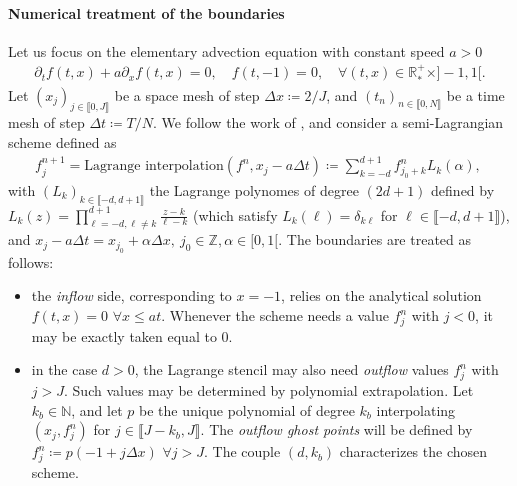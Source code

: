\documentclass{article}
\numberwithin{equation}{section}
\newcommand{\N}{\mathbb{N}}
\newcommand{\R}{\mathbb{R}}
\newcommand{\todo}[1]{{\color{red}\textbf{#1}}}
\begin{document}


\paragraph{Numerical treatment of the boundaries}

Let us focus on the elementary advection equation with constant speed $a>0$
\begin{align*}
	\partial_t f (t,x) + a \partial_x f(t,x) = 0, \quad f(t,-1) = 0, \quad \forall (t,x) \in \R^+_* \times ]-1,1[.
\end{align*}
Let $(x_j)_{j\in\llbracket0,J\rrbracket}$ be a space mesh of step $\Delta x \coloneqq 2/J$, and $(t_n)_{n\in\llbracket 0,N \rrbracket}$ be a time mesh of step $\Delta t \coloneqq T/N$.
We follow the work of \cite{coulombelNeumannNumericalBoundary2020, boutinHighOrderNumerical2021}, and consider a semi-Lagrangian scheme defined as
\begin{align*}
	f^{n+1}_j = \text{Lagrange interpolation}\left(f^n, x_j - a \Delta t\right) \coloneqq \sum_{k=-d}^{d+1} f^n_{j_0+k} L_k (\alpha), \ 
\end{align*}
with $(L_k)_{k\in\llbracket-d,d+1\rrbracket}$ the Lagrange polynomes of degree $(2d+1)$ defined by $L_k(z)=\prod_{\ell=-d,\ell\not=k}^{d+1}\frac{z-k}{\ell-k}$
(which satisfy $L_k(\ell) = \delta_{k\ell}$ for $\ell\in \llbracket-d,d+1\rrbracket$), and $x_j - a \Delta t = x_{j_0}+\alpha \Delta x,\ j_0\in \mathbb{Z}, \alpha\in [0,1[$.
The boundaries are treated as follows:
\begin{itemize}
\item the \emph{inflow} side, corresponding to $x=-1$, relies on the analytical solution $f(t,x) = 0$ $\forall x \leqslant a t$. Whenever the scheme needs a value $f^n_j$ with $j < 0$, it may be exactly taken equal to 0.
\item in the case $d>0$, the Lagrange stencil may also need \emph{outflow} values $f^n_{j}$ with $j>J$. Such values may be determined by polynomial extrapolation. Let $k_b \in \N$, and let $p$ be the unique polynomial of degree $k_b$ interpolating $(x_j, f^n_j)$ for $j\in \llbracket J-k_b,J\rrbracket$. The \emph{outflow ghost points} will be defined by $f^n_j \coloneqq p(-1 + j \Delta x)$ $\forall j > J$. The couple $(d,k_b)$ characterizes the chosen scheme. 
\end{itemize}
\end{document}
